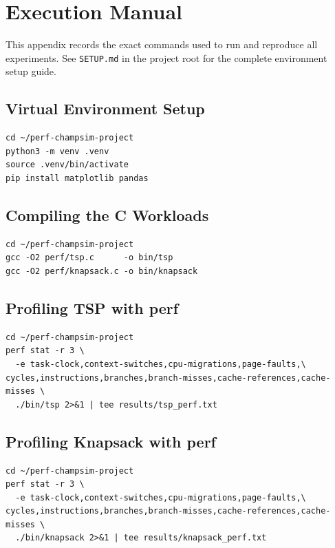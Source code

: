 \documentclass[11pt,a4paper]{article}
\begin{document}
\appendix
\section{Execution Manual}

This appendix records the exact commands used to run and reproduce all
experiments.  See \texttt{SETUP.md} in the project root for the complete
environment setup guide.

\subsection{Virtual Environment Setup}
\begin{lstlisting}
cd ~/perf-champsim-project
python3 -m venv .venv
source .venv/bin/activate
pip install matplotlib pandas
\end{lstlisting}

\subsection{Compiling the C Workloads}
\begin{lstlisting}
cd ~/perf-champsim-project
gcc -O2 perf/tsp.c      -o bin/tsp
gcc -O2 perf/knapsack.c -o bin/knapsack
\end{lstlisting}

\subsection{Profiling TSP with perf}
\begin{lstlisting}
cd ~/perf-champsim-project
perf stat -r 3 \
  -e task-clock,context-switches,cpu-migrations,page-faults,\
cycles,instructions,branches,branch-misses,cache-references,cache-misses \
  ./bin/tsp 2>&1 | tee results/tsp_perf.txt
\end{lstlisting}

\subsection{Profiling Knapsack with perf}
\begin{lstlisting}
cd ~/perf-champsim-project
perf stat -r 3 \
  -e task-clock,context-switches,cpu-migrations,page-faults,\
cycles,instructions,branches,branch-misses,cache-references,cache-misses \
  ./bin/knapsack 2>&1 | tee results/knapsack_perf.txt
\end{lstlisting}
\end{document}
